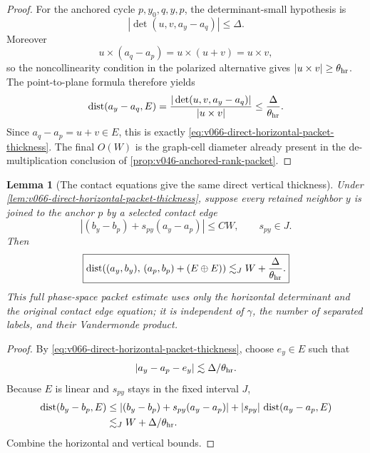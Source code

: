 \documentclass[10pt]{article}
\newtheorem{lemma}[theorem]{Lemma}
\begin{document}
\begin{proof}
For the anchored cycle \(p,y_0,q,y,p\), the determinant-small hypothesis is
\[
|\det(u,v,a_y-a_q)|\le\Delta.
\]
Moreover
\[
u\times(a_q-a_p)=u\times(u+v)=u\times v,
\]
so the noncollinearity condition in the polarized alternative gives
\(|u\times v|\ge\theta_{\rm hr}\).  The point-to-plane formula therefore yields
\[
\operatorname{dist}(a_y-a_q,E)
=
\frac{|\det(u,v,a_y-a_q)|}{|u\times v|}
\le
\frac{\Delta}{\theta_{\rm hr}}.
\]
Since \(a_q-a_p=u+v\in E\), this is exactly
\eqref{eq:v066-direct-horizontal-packet-thickness}.  The final \(O(W)\) is the graph-cell
diameter already present in the de-multiplication conclusion of
\cref{prop:v046-anchored-rank-packet}.
\end{proof}

\begin{lemma}[The contact equations give the same direct vertical thickness]
\label{lem:v067-direct-contact-packet-thickness}
Under \cref{lem:v066-direct-horizontal-packet-thickness}, suppose every retained neighbor \(y\)
is joined to the anchor \(p\) by a selected contact edge
\[
|(b_y-b_p)+s_{py}(a_y-a_p)|\le C W,
\qquad s_{py}\in J.
\]
Then
\begin{equation}
\label{eq:v067-direct-contact-packet-thickness}
\boxed{
\operatorname{dist}\!\left(
(a_y,b_y),\,
(a_p,b_p)+(E\oplus E)
\right)
\lesssim_J
W+\frac{\Delta}{\theta_{\rm hr}}.
}
\end{equation}
This full phase-space packet estimate uses only the horizontal determinant and the original contact
edge equation; it is independent of \(\gamma\), the number of separated labels, and their
Vandermonde product.
\end{lemma}

\begin{proof}
By \eqref{eq:v066-direct-horizontal-packet-thickness}, choose \(e_y\in E\) such that
\[
|a_y-a_p-e_y|
\lesssim
\Delta/\theta_{\rm hr}.
\]
Because \(E\) is linear and \(s_{py}\) stays in the fixed interval \(J\),
\[
\begin{aligned}
\operatorname{dist}(b_y-b_p,E)
&\le
|(b_y-b_p)+s_{py}(a_y-a_p)|
+|s_{py}|\,\operatorname{dist}(a_y-a_p,E)\\
&\lesssim_J
W+\Delta/\theta_{\rm hr}.
\end{aligned}
\]
Combine the horizontal and vertical bounds.
\end{proof}
\end{document}
